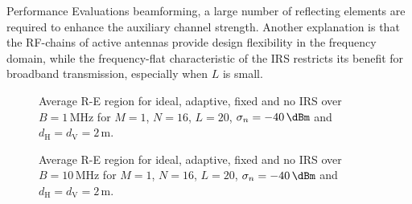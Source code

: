 \documentclass[journal]{IEEEtran}
\begin{document}
\begin{section}{Performance Evaluations}
beamforming, a large number of reflecting elements are required to enhance the auxiliary channel strength. Another explanation is that the RF-chains of active antennas provide design flexibility in the frequency domain, while the frequency-flat characteristic of the IRS restricts its benefit for broadband transmission, especially when $L$ is small.
		\begin{figure}[!t]
			\centering
			\begin{adjustbox}{width=0.9\columnwidth}
				
			\end{adjustbox}
			\caption{Average R-E region for ideal, adaptive, fixed and no IRS over $B=1\,\si{\MHz}$ for $M=1$, $N=16$, $L=20$, $\sigma_n=-40\,\si{\dBm}$ and $d_{\mathrm{H}}=d_{\mathrm{V}}=2\,\si{\meter}$.}
			\label{fi:re_irs_1mhz}
		\end{figure}

		\begin{figure}[!t]
			\centering
			\begin{adjustbox}{width=0.9\columnwidth}
				
			\end{adjustbox}
			\caption{Average R-E region for ideal, adaptive, fixed and no IRS over $B=10\,\si{\MHz}$ for $M=1$, $N=16$, $L=20$, $\sigma_n=-40\,\si{\dBm}$ and $d_{\mathrm{H}}=d_{\mathrm{V}}=2\,\si{\meter}$.}
			\label{fi:re_irs_10mhz}
		\end{figure}


\end{section}
\end{document}
